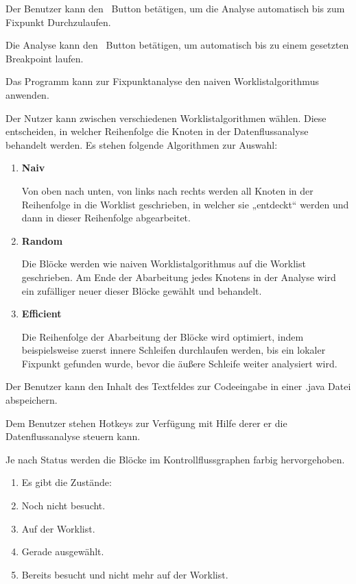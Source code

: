 Der Benutzer kann den \faPlay\ Button betätigen, um die Analyse automatisch bis zum Fixpunkt Durchzulaufen.

Die Analyse kann den \faPlay\ Button betätigen, um automatisch bis zu einem gesetzten Breakpoint laufen.

Das Programm kann zur Fixpunktanalyse den naiven Worklistalgorithmus anwenden.

Der Nutzer kann zwischen verschiedenen Worklistalgorithmen wählen. Diese
entscheiden, in welcher Reihenfolge die Knoten in der Datenflussanalyse behandelt
werden. Es stehen folgende Algorithmen zur Auswahl:
\begin{enumerate}[label=(\alph*)]
\item \textbf{Naiv} \par
Von oben nach unten, von links nach rechts werden all Knoten in der Reihenfolge in
die Worklist geschrieben, in welcher sie „entdeckt“ werden und dann in dieser
Reihenfolge abgearbeitet.
\item \textbf{Random} \par
Die Blöcke werden wie naiven Worklistalgorithmus auf die Worklist geschrieben. Am Ende der Abarbeitung jedes Knotens in der Analyse wird ein
zufälliger neuer dieser Blöcke gewählt und behandelt.
\item \textbf{Efficient} \par
Die Reihenfolge der Abarbeitung der Blöcke wird optimiert, indem beispielsweise
zuerst innere Schleifen durchlaufen werden, bis ein lokaler Fixpunkt gefunden wurde, bevor die äußere Schleife weiter analysiert wird.
\end{enumerate}

Der Benutzer kann den Inhalt des Textfeldes zur Codeeingabe in einer .java Datei abspeichern.

Dem Benutzer stehen Hotkeys zur Verfügung mit Hilfe derer er die Datenflussanalyse steuern kann.

Je nach Status werden die Blöcke im Kontrollflussgraphen farbig hervorgehoben.
\begin{enumerate}[label=(\alph*)]
\item Es gibt die Zustände:
\item Noch nicht besucht.
\item Auf der Worklist.
\item Gerade ausgewählt.
\item Bereits besucht und nicht mehr auf der Worklist.
\end{enumerate}

